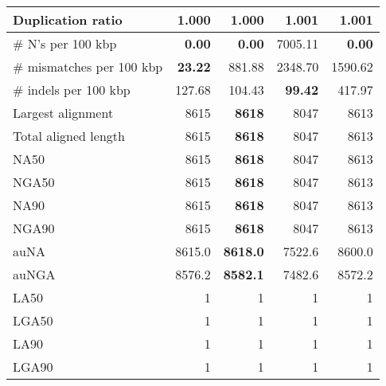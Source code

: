 \documentclass[12pt,a4paper]{article}
\begin{document}
\begin{table}[ht]
\begin{center}
\begin{tabular}{|l*{4}{|r}|}
Duplication ratio & {\bf 1.000} & {\bf 1.000} & 1.001 & 1.001 \\ \hline
\# N's per 100 kbp & {\bf 0.00} & {\bf 0.00} & 7005.11 & {\bf 0.00} \\ \hline
\# mismatches per 100 kbp & {\bf 23.22} & 881.88 & 2348.70 & 1590.62 \\ \hline
\# indels per 100 kbp & 127.68 & 104.43 & {\bf 99.42} & 417.97 \\ \hline
Largest alignment & 8615 & {\bf 8618} & 8047 & 8613 \\ \hline
Total aligned length & 8615 & {\bf 8618} & 8047 & 8613 \\ \hline
NA50 & 8615 & {\bf 8618} & 8047 & 8613 \\ \hline
NGA50 & 8615 & {\bf 8618} & 8047 & 8613 \\ \hline
NA90 & 8615 & {\bf 8618} & 8047 & 8613 \\ \hline
NGA90 & 8615 & {\bf 8618} & 8047 & 8613 \\ \hline
auNA & 8615.0 & {\bf 8618.0} & 7522.6 & 8600.0 \\ \hline
auNGA & 8576.2 & {\bf 8582.1} & 7482.6 & 8572.2 \\ \hline
LA50 & 1 & 1 & 1 & 1 \\ \hline
LGA50 & 1 & 1 & 1 & 1 \\ \hline
LA90 & 1 & 1 & 1 & 1 \\ \hline
LGA90 & 1 & 1 & 1 & 1 \\ \hline
\end{tabular}
\end{center}
\end{table}
\end{document}
